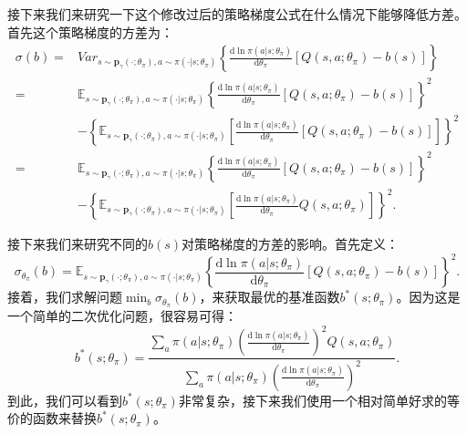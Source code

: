 接下来我们来研究一下这个修改过后的策略梯度公式在什么情况下能够降低方差。首先这个策略梯度的方差为：
\begin{align*}
    \sigma(b) =& Var_{s \sim \mathbf{p}_{\gamma}(\cdot; \theta_\pi), 
        a \sim \pi(\cdot \vert s; \theta_\pi)}
    \left\{
        \frac{\mathrm{d}\ln\pi(a \vert s; \theta_\pi)}{\mathrm{d}\theta_\pi}     
        [Q(s, a; \theta_\pi) - b(s)]
    \right\} \\
    =& \mathbb{E}_{s \sim \mathbf{p}_{\gamma}(\cdot; \theta_\pi), 
        a \sim \pi(\cdot \vert s; \theta_\pi)}
    \left\{ 
        \frac{\mathrm{d}\ln\pi(a \vert s; \theta_\pi)}{\mathrm{d}\theta_\pi}     
        [Q(s, a; \theta_\pi) - b(s)]
    \right\}^2 \\
    & -\left\{\mathbb{E}_{s \sim \mathbf{p}_{\gamma}(\cdot; \theta_\pi), 
        a \sim \pi(\cdot \vert s; \theta_\pi)}
        \left[ 
        \frac{\mathrm{d}\ln\pi(a \vert s; \theta_\pi)}{\mathrm{d}\theta_\pi}     
        [Q(s, a; \theta_\pi) - b(s)] \right]
    \right\}^2 \\
    =& \mathbb{E}_{s \sim \mathbf{p}_{\gamma}(\cdot; \theta_\pi), 
        a \sim \pi(\cdot \vert s; \theta_\pi)}
    \left\{ 
        \frac{\mathrm{d}\ln\pi(a \vert s; \theta_\pi)}{\mathrm{d}\theta_\pi}     
        [Q(s, a; \theta_\pi) - b(s)]
    \right\}^2 \\
    & -\left\{\mathbb{E}_{s \sim \mathbf{p}_{\gamma}(\cdot; \theta_\pi), 
        a \sim \pi(\cdot \vert s; \theta_\pi)}
        \left[ 
        \frac{\mathrm{d}\ln\pi(a \vert s; \theta_\pi)}{\mathrm{d}\theta_\pi}     
        Q(s, a; \theta_\pi) \right]
    \right\}^2.
\end{align*}

接下来我们来研究不同的$b(s)$对策略梯度的方差的影响。首先定义：
\begin{equation}
    \sigma_{\theta_\pi}(b) = 
    \mathbb{E}_{s \sim \mathbf{p}_{\gamma}(\cdot; \theta_\pi), 
        a \sim \pi(\cdot \vert s; \theta_\pi)}
    \left\{ 
        \frac{\mathrm{d}\ln\pi(a \vert s; \theta_\pi)}{\mathrm{d}\theta_\pi}     
        [Q(s, a; \theta_\pi) - b(s)]
    \right\}^2.
\end{equation}
接着，我们求解问题$\min_b \sigma_{\theta_\pi}(b)$，来获取最优的基准函数$b^*(s; \theta_\pi)$。因为这是一个简单的二次优化问题，很容易可得：
\begin{equation}
    b^*(s; \theta_\pi) = 
        \frac{ \sum_{a} \pi(a \vert s; \theta_\pi)
        \left(\frac{\mathrm{d}\ln\pi(a \vert s; \theta_\pi)}
        {\mathrm{d}\theta_\pi}\right)^2 Q(s, a; \theta_\pi)}
        {\sum_{a} \pi(a \vert s; \theta_\pi)
        \left(\frac{\mathrm{d}\ln\pi(a \vert s; \theta_\pi)}
        {\mathrm{d}\theta_\pi}\right)^2}.
\end{equation}
到此，我们可以看到$b^*(s; \theta_\pi)$非常复杂，接下来我们使用一个相对简单好求的等价的函数来替换$b^*(s;\theta_\pi)$。

